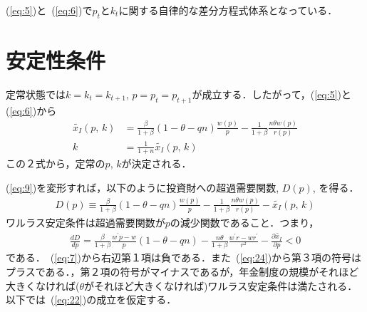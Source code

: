 \documentclass[12pt,a4paper]{jsarticle}
\begin{document}
(\ref{eq:5})と~(\ref{eq:6})で$p_{t}$と$k_{t}$に関する自律的な差分方程式体系となっている．
\section{安定性条件}



定常状態では$k=k_{t} = k_{t+1}, \, p=p_{t} = p_{t+1}$が成立する．したがって，(\ref{eq:5})と(\ref{eq:6})から
\begin{align}
\tilde{x_{I}}(p, \, k)  &= \frac{\beta}{1+\beta}(1-\theta-qn)\frac{w(p)}{p} - \frac{1}{1+\beta}\frac{ n \theta w(p)}{r(p)} \label{eq:9} \\
 k &= \frac{1}{1+n}\tilde{x_{I}}(p, \, k) \label{eq:10}
\end{align}
この２式から，定常の$p, \, k$が決定される．

(\ref{eq:9})を変形すれば，以下のように投資財への超過需要関数, $D(p)$, を得る．
\begin{align}
 D(p)  \equiv \frac{\beta}{1+\beta}(1-\theta-qn)\frac{w(p)}{p} - \frac{1}{1+\beta}\frac{ n \theta w(p)}{r(p)} - \tilde{x_{I}}(p, \, k) \label{eq:16}
\end{align}
ワルラス安定条件は超過需要関数が$p$の減少関数であること．つまり，
\begin{align}
 \frac{dD}{dp} = \frac{\beta}{1+\beta}\frac{w^{\prime}p - w}{p}\left(1-\theta - qn \right) - \frac{n \theta}{1+\beta}\frac{w^{\prime}r - wr^{\prime}}{r^{2}} - \frac{\partial \tilde{x_{I}}}{\partial p} <0 \label{eq:22}
\end{align}
である．~(\ref{eq:7})から右辺第１項は負である．また~(\ref{eq:24})から第３項の符号はプラスである．，第２項の符号がマイナスであるが，年金制度の規模がそれほど大きくなければ($\theta$がそれほど大きくなければ)ワルラス安定条件は満たされる．以下では~(\ref{eq:22})の成立を仮定する．
\end{document}

